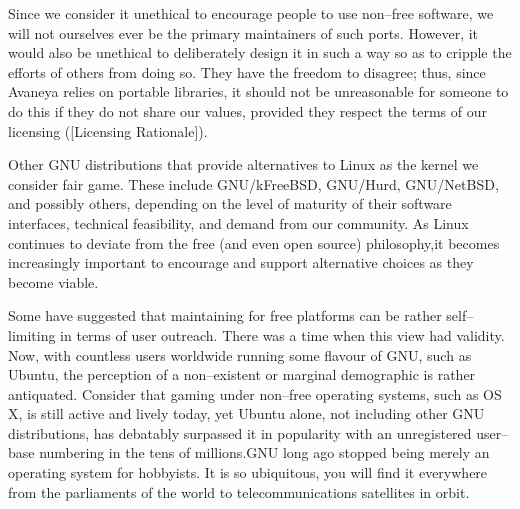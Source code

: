 Since we consider it unethical to encourage people to use non--free software, we will not ourselves ever be the primary maintainers of such ports. However, it would also be unethical to deliberately design it in such a way so as to cripple the efforts of others from doing so. They have the freedom to disagree; thus, since Avaneya relies on portable libraries, it should not be unreasonable for someone to do this if they do not share our values, provided they respect the terms of our licensing ([Licensing Rationale]).

Other GNU distributions that provide alternatives to Linux as the kernel we consider fair game. These include GNU/kFreeBSD, GNU/Hurd, GNU/NetBSD, and possibly others, depending on the level of maturity of their software interfaces, technical feasibility, and demand from our community. As Linux continues to deviate from the free (and even open source) philosophy, it becomes increasingly important to encourage and support alternative choices as they become viable.

Some have suggested that maintaining for free platforms can be rather self--limiting in terms of user outreach. There was a time when this view had validity. Now, with countless users worldwide running some flavour of GNU, such as Ubuntu, the perception of a non--existent or marginal demographic is rather antiquated. Consider that gaming under non--free operating systems, such as OS X, is still active and lively today, yet Ubuntu alone, not including other GNU distributions, has debatably surpassed it in popularity with an unregistered user--base numbering in the tens of millions. GNU long ago stopped being merely an operating system for hobbyists. It is so ubiquitous, you will find it everywhere from the parliaments of the world to telecommunications satellites in orbit.

\StopChapter

